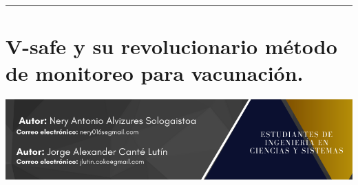 \documentclass[12pt,spanish,Letterpaper,openany]{book}
\newcommand{\HRule}{\begin{center}\rule{0.5\linewidth}{0.2mm}\end{center}}
\begin{document}
\medskip

\HRule

\medskip

\hypertarget{pareja69}{%
\chapter{V-safe y su revolucionario método de monitoreo para vacunación.}\label{pareja69}}

\begin{center}\includegraphics[width=1\linewidth]{images/pareja69_01} \end{center}
\end{document}
